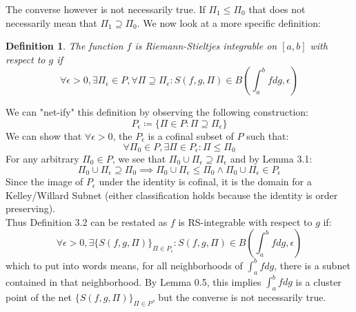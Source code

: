 \documentclass[10pt,letterpaper]{article} %
\newtheorem{defn}{Definition}[section]
\begin{document}
The converse however is not necessarily true. If $\Pi_1 \leq \Pi_0$ that does not necessarily mean that $\Pi_1 \supseteq \Pi_0$. We now look at a more specific definition:
\begin{defn}
The function $f$ is Riemann-Stieltjes integrable on $[a, b]$ with respect to $g$ if
\begin{equation*}
\forall \epsilon > 0, \exists \Pi_\epsilon \in P, \forall \Pi \supseteq \Pi_\epsilon: S(f, g, \Pi) \in B\left(\int_{a}^{b}fdg, \epsilon\right)
\end{equation*}
\end{defn}
We can "net-ify" this definition by observing the following construction:
\begin{equation*}
P_\epsilon \coloneq \{\Pi \in P : \Pi \supseteq \Pi_\epsilon\} 
\end{equation*}
We can show that $\forall \epsilon > 0$, the $P_\epsilon$ is a cofinal subset of $P$ such that:
\begin{equation*}
\forall \Pi_0 \in P, \exists \Pi \in P_\epsilon: \Pi \leq \Pi_0
\end{equation*}
For any arbitrary $\Pi_0 \in P$, we see that $\Pi_0 \cup \Pi_\epsilon \supseteq \Pi_\epsilon$ and by Lemma 3.1:
\begin{equation*}
\Pi_0 \cup \Pi_\epsilon \supseteq \Pi_0 \implies \Pi_0 \cup \Pi_\epsilon \leq \Pi_0 \land \Pi_0\cup \Pi_\epsilon \in P_\epsilon
\end{equation*}
Since the image of $P_\epsilon$ under the identity is cofinal, it is the domain for a Kelley/Willard Subnet (either classification holds because the identity is order preserving).\\

Thus Definition 3.2 can be restated as $f$ is RS-integrable with respect to $g$ if:
\begin{equation*}
\forall \epsilon > 0, \exists \{S(f, g, \Pi)\}_{\Pi \in P_\epsilon}: S(f, g, \Pi) \in B\left(\int_{a}^{b}fdg, \epsilon\right)
\end{equation*}
which to put into words means, for all neighborhoods of $\int_{a}^{b}fdg$, there is a subnet contained in that neighborhood. By Lemma 0.5, this implies $\int_{a}^{b}fdg$ is a cluster point of the net $\{S(f, g, \Pi)\}_{\Pi \in P}$, but the converse is not necessarily true.
\end{document}
